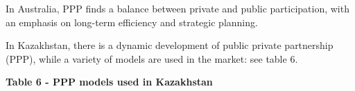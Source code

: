 
In Australia, PPP finds a balance between private and public
participation, with an emphasis on long-term efficiency and strategic
planning.

In Kazakhstan, there is a dynamic development of public private
partnership (PPP), while a variety of models are used in the market: see
table 6.

{\bfseries Table 6 - PPP models used in Kazakhstan}

